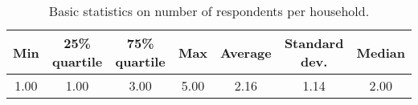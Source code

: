 \begin{table}[ht]
\begin{small}
\caption{Basic statistics on number of respondents per household.}
\label{tab:H_SIZE_stats}
\begingroup\setlength{\tabcolsep}{12pt}
\begin{tabular}{ccccccc}
  \hline
Min & 25\% quartile & 75\% quartile & Max & Average & Standard dev. & Median \\ 
  \hline
1.00 & 1.00 & 3.00 & 5.00 & 2.16 & 1.14 & 2.00 \\ 
   \hline
\end{tabular}
\endgroup
\end{small}
\end{table}
